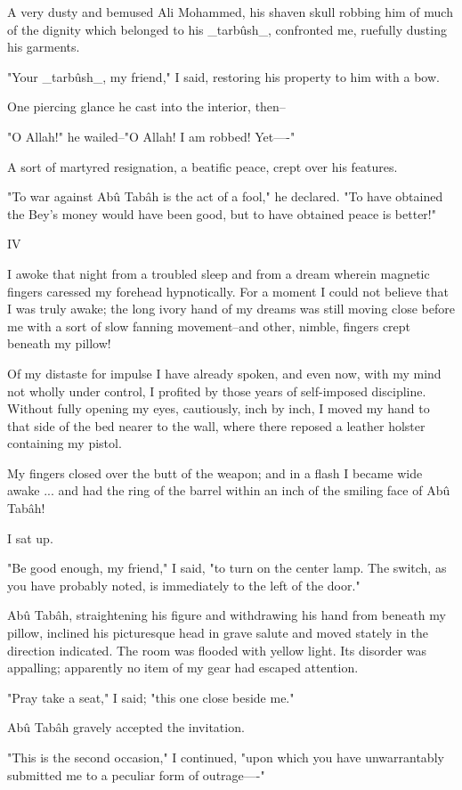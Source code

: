 A very dusty and bemused Ali Mohammed, his shaven skull robbing him of
much of the dignity which belonged to his _tarbûsh_, confronted me,
ruefully dusting his garments.

"Your _tarbûsh_, my friend," I said, restoring his property to him
with a bow.

One piercing glance he cast into the interior, then--

"O Allah!" he wailed--"O Allah! I am robbed! Yet----"

A sort of martyred resignation, a beatific peace, crept over his
features.

"To war against Abû Tabâh is the act of a fool," he declared. "To have
obtained the Bey's money would have been good, but to have obtained
peace is better!"


IV

I awoke that night from a troubled sleep and from a dream wherein
magnetic fingers caressed my forehead hypnotically. For a moment I
could not believe that I was truly awake; the long ivory hand of my
dreams was still moving close before me with a sort of slow fanning
movement--and other, nimble, fingers crept beneath my pillow!

Of my distaste for impulse I have already spoken, and even now, with
my mind not wholly under control, I profited by those years of
self-imposed discipline. Without fully opening my eyes, cautiously,
inch by inch, I moved my hand to that side of the bed nearer to the
wall, where there reposed a leather holster containing my pistol.

My fingers closed over the butt of the weapon; and in a flash I
became wide awake ... and had the ring of the barrel within an inch of
the smiling face of Abû Tabâh!

I sat up.

"Be good enough, my friend," I said, "to turn on the center lamp. The
switch, as you have probably noted, is immediately to the left of the
door."

Abû Tabâh, straightening his figure and withdrawing his hand from
beneath my pillow, inclined his picturesque head in grave salute and
moved stately in the direction indicated. The room was flooded with
yellow light. Its disorder was appalling; apparently no item of my
gear had escaped attention.

"Pray take a seat," I said; "this one close beside me."

Abû Tabâh gravely accepted the invitation.

"This is the second occasion," I continued, "upon which you have
unwarrantably submitted me to a peculiar form of outrage----"

